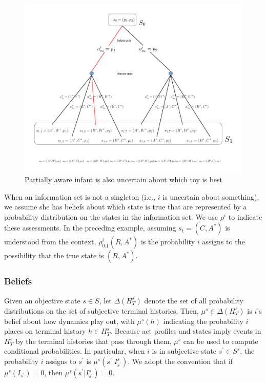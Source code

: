 \documentclass[
11pt,
titlepage,
reqno,
]{article}%
\theoremstyle{definition}
\begin{document}
\begin{figure}[h!]
	\centering
	\includegraphics*[page=3,trim = 0in 6in 6.5in 0in,scale=.8]{Awareness_Diagrams_All}
	\caption{Partially aware infant is also uncertain about which toy is best\label{Diag: p-03}}%
\end{figure}
	
When an information set is not a singleton (i.e., $i$ is uncertain about something), we assume she has beliefs about which state is true that are represented by a probability distribution on the states in the information set. 
We use $\rho^i$ to indicate these assessments. 
In the preceding example, assuming $s_t=(C,A^\ast)$ is understood from the context, $\rho^i_{0.1}(R,A^\ast)$ is the probability $i$ assigns to the possibility that the true state is $(R,A^\ast)$.
	
\subsubsection{Beliefs} \label{sec: beliefs}
Given an objective state $s\in S$, let $\Delta(H^s_T)$ denote the set of all probability distributions on the set of subjective terminal histories. 
Then,  $\mu^s\in \Delta(H^s_T)$  is $i$'s belief about how dynamics play out, with $\mu^s(h)$ indicating the probability $i$ places on terminal history $h\in H^s_T$. 
Because act profiles and states imply events in $H^s_T$ by the terminal histories that pass through them, $\mu^s$ can be used to compute conditional probabilities.
In particular, when $i$ is in subjective state $s^\prime\in S^s$, the probability $i$ assigns to $s^\prime$ is  $\mu^s(s^\prime|I^s_{s^\prime})$.
We adopt the convention that if  $\mu^s(I_{s^\prime})=0$, then  $\mu^s(s^\prime|I^s_{s^\prime})=0$.
\end{document}
